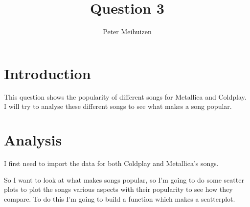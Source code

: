 \documentclass[11pt,preprint, authoryear]{elsarticle}
\numberwithin{equation}{section}
\numberwithin{figure}{section}
\numberwithin{table}{section}
\begin{document}
\begin{frontmatter}  %

\title{Question 3}





\author[Add1]{Peter Meihuizen}





\address[Add1]{Stellenbosch University}



\vspace{1cm}





\vspace{0.5cm}

\end{frontmatter}

\setcounter{footnote}{0}



\pagestyle{fancy}
\chead{}
\rhead{}
\lfoot{}
\lhead{}
\cfoot{}


\headsep 35pt %




\hypertarget{introduction}{%
\section{\texorpdfstring{Introduction
\label{Introduction}}{Introduction }}\label{introduction}}

This question shows the popularity of different songs for Metallica and
Coldplay. I will try to analyse these different songs to see what makes
a song popular.

\hypertarget{analysis}{%
\section{\texorpdfstring{Analysis
\label{Analysis}}{Analysis }}\label{analysis}}

I first need to import the data for both Coldplay and Metallica's songs.

So I want to look at what makes songs popular, so I'm going to do some
scatter plots to plot the songs various aspects with their popularity to
see how they compare. To do this I'm going to build a function which
makes a scatterplot.
\end{document}
